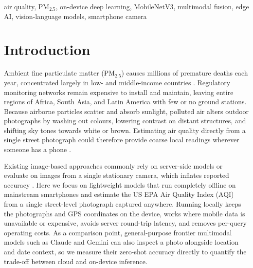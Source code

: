 \documentclass[conference]{IEEEtran}
\newcommand{\pmtwofive}{PM$_{2.5}$}
\begin{document}
\begin{IEEEkeywords}
  air quality, \pmtwofive, on-device deep learning, MobileNetV3, multimodal
  fusion, edge AI, vision-language models, smartphone camera
\end{IEEEkeywords}

\section{Introduction}

Ambient fine particulate matter (\pmtwofive) causes millions of premature deaths
each year, concentrated largely in low- and middle-income countries
\cite{who2024airquality}. Regulatory monitoring networks remain expensive to
install and maintain, leaving entire regions of Africa, South Asia, and Latin
America with few or no ground stations. Because airborne particles scatter and
absorb sunlight, polluted air alters outdoor photographs by washing out colours,
lowering contrast on distant structures, and shifting sky tones towards white or
brown. Estimating air quality directly from a single street photograph could
therefore provide coarse local readings wherever someone has a phone
\cite{wangLightweightAirQuality2024, kambleMobileImageDrivenPM252025}.

Existing image-based approaches commonly rely on server-side models or evaluate
on images from a single stationary camera, which inflates reported accuracy
\cite{bylerLocationGeneralizabilityImageBased2025,
nathvaniHereNowEvaluating2023}. Here we focus on lightweight models that run
completely offline on mainstream smartphones and estimate the US EPA Air Quality
Index (AQI) from a single street-level photograph captured anywhere. Running
locally keeps the photographs and GPS coordinates on the device, works where
mobile data is unavailable or expensive, avoids server round-trip latency, and
removes per-query operating costs. As a comparison point, general-purpose
frontier multimodal models such as Claude and Gemini can also inspect a photo
alongside location and date context, so we measure their zero-shot accuracy
directly to quantify the trade-off between cloud and on-device inference.
\end{document}
